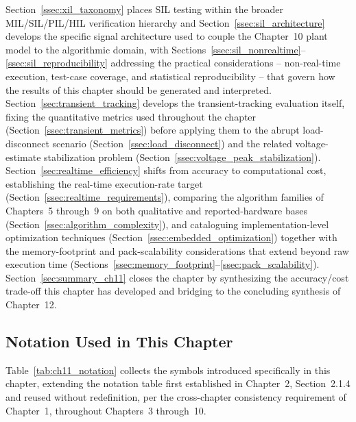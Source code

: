 Section~\ref{ssec:xil_taxonomy} places SIL testing within the broader MIL/SIL/PIL/HIL verification hierarchy and Section~\ref{ssec:sil_architecture} develops the specific signal architecture used to couple the Chapter~10 plant model to the algorithmic domain, with Sections~\ref{ssec:sil_nonrealtime}--\ref{ssec:sil_reproducibility} addressing the practical considerations -- non-real-time execution, test-case coverage, and statistical reproducibility -- that govern how the results of this chapter should be generated and interpreted. Section~\ref{sec:transient_tracking} develops the transient-tracking evaluation itself, fixing the quantitative metrics used throughout the chapter (Section~\ref{ssec:transient_metrics}) before applying them to the abrupt load-disconnect scenario (Section~\ref{ssec:load_disconnect}) and the related voltage-estimate stabilization problem (Section~\ref{ssec:voltage_peak_stabilization}). Section~\ref{sec:realtime_efficiency} shifts from accuracy to computational cost, establishing the real-time execution-rate target (Section~\ref{ssec:realtime_requirements}), comparing the algorithm families of Chapters~5 through~9 on both qualitative and reported-hardware bases (Section~\ref{ssec:algorithm_complexity}), and cataloguing implementation-level optimization techniques (Section~\ref{ssec:embedded_optimization}) together with the memory-footprint and pack-scalability considerations that extend beyond raw execution time (Sections~\ref{ssec:memory_footprint}--\ref{ssec:pack_scalability}). Section~\ref{sec:summary_ch11} closes the chapter by synthesizing the accuracy/cost trade-off this chapter has developed and bridging to the concluding synthesis of Chapter~12.

\subsection{Notation Used in This Chapter}
\label{ssec:ch11_notation}

Table~\ref{tab:ch11_notation} collects the symbols introduced specifically in this chapter, extending the notation table first established in Chapter~2, Section~2.1.4 and reused without redefinition, per the cross-chapter consistency requirement of Chapter~1, throughout Chapters~3 through~10.

